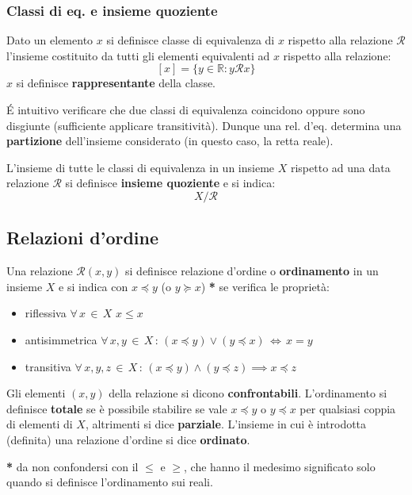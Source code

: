 \documentclass[10pt, oneside]{book}
\theoremstyle{plain}
\begin{document}
\subsubsection{Classi di eq. e insieme quoziente}
\begin{defin}
    Dato un elemento $x$ si definisce classe di equivalenza di $x$ rispetto alla relazione $\mathcal{R}$ l'insieme costituito da tutti gli elementi equivalenti ad $x$ rispetto alla relazione:
    \[[x] = \{y \in \mathbb{R} : y\mathcal{R}x\}\]
    $x$ si definisce \textbf{rappresentante} della classe.
\end{defin}
\'E intuitivo verificare che due classi di equivalenza coincidono oppure sono disgiunte (sufficiente applicare transitività). Dunque una rel. d'eq. determina una \textbf{partizione} dell'insieme considerato (in questo caso, la retta reale).
\begin{defin}
    L'insieme di tutte le classi di equivalenza in un insieme $X$ rispetto ad una data relazione $\mathcal{R}$ si definisce \textbf{insieme quoziente} e si indica:
    \[X / \mathcal{R}\]
\end{defin}

\subsection{Relazioni d'ordine}
\begin{defin}
Una relazione $\mathcal{R}(x,y)$ si definisce relazione d'ordine o \textbf{ordinamento} in un insieme $X$ e si indica con $x \preceq y$ (o $y \succeq x$) \textbf{*} se verifica le proprietà:
\begin{itemize}
\item riflessiva $\forall \, x \, \in \, X$ $x \leq x$
\item antisimmetrica $\forall \, x, y \, \in \, X \, : \, (x \preceq y) \lor (y \preceq x) \, \Leftrightarrow \, x = y$
\item transitiva $\forall \, x,y,z \, \in \, X \, : \, (x \preceq y) \land (y \preceq z) \implies x \preceq z$ 
\end{itemize}
Gli elementi $(x,y)$ della relazione si dicono \textbf{confrontabili}. L'ordinamento si definisce \textbf{totale} se è possibile stabilire se vale $x \preceq y$ o $y \preceq x$ per qualsiasi coppia di elementi di $X$, altrimenti si dice \textbf{parziale}. L'insieme in cui è introdotta (definita) una relazione d'ordine si dice \textbf{ordinato}.
\end{defin}
\textbf{*} da non confondersi con il $\leq$ e $\geq$, che hanno il medesimo significato solo quando si definisce l'ordinamento sui reali.\\
\end{document}
